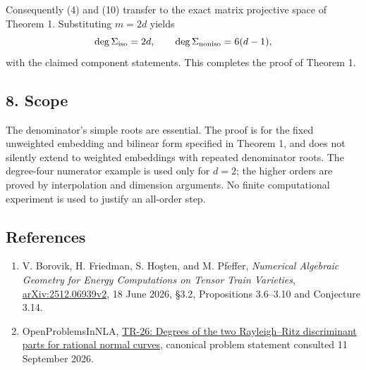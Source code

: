 \documentclass[
  11pt,
]{article}
\providecommand{\tightlist}{%
  \setlength{\itemsep}{0pt}\setlength{\parskip}{0pt}}
\begin{document}
Consequently (4) and (10) transfer to the exact matrix projective space
of Theorem 1. Substituting \(m=2d\) yields \[
 \deg\Sigma_{\rm iso}=2d,\qquad
 \deg\Sigma_{\rm noniso}=6(d-1),
\] with the claimed component statements. This completes the proof of
Theorem 1.

\subsection{8. Scope}\label{scope}

The denominator's simple roots are essential. The proof is for the fixed
unweighted embedding and bilinear form specified in Theorem 1, and does
not silently extend to weighted embeddings with repeated denominator
roots. The degree-four numerator example is used only for \(d=2\); the
higher orders are proved by interpolation and dimension arguments. No
finite computational experiment is used to justify an all-order step.

\subsection{References}\label{references}

\begin{enumerate}
\def\labelenumi{\arabic{enumi}.}
\tightlist
\item
  V. Borovik, H. Friedman, S. Hoşten, and M. Pfeffer, \emph{Numerical
  Algebraic Geometry for Energy Computations on Tensor Train Varieties},
  \href{https://arxiv.org/html/2512.06939v2}{arXiv:2512.06939v2}, 18
  June 2026, §3.2, Propositions 3.6--3.10 and Conjecture 3.14.
\item
  OpenProblemsInNLA,
  \href{https://github.com/ajt60gaibb/OpenProblemsInNLA/blob/main/tensor-computations/TR-26/README.md}{TR-26:
  Degrees of the two Rayleigh--Ritz discriminant parts for rational
  normal curves}, canonical problem statement consulted 11 September
  2026.
\end{enumerate}
\end{document}
